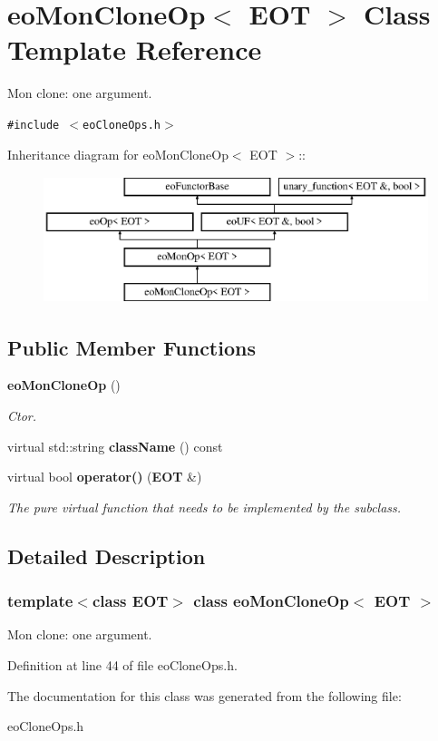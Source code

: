\section{eo\-Mon\-Clone\-Op$<$ EOT $>$ Class Template Reference}
\label{classeo_mon_clone_op}
Mon clone: one argument.  


{\tt \#include $<$eo\-Clone\-Ops.h$>$}

Inheritance diagram for eo\-Mon\-Clone\-Op$<$ EOT $>$::\begin{figure}[H]
\begin{center}
\leavevmode
\includegraphics[height=3.71476cm]{classeo_mon_clone_op}
\end{center}
\end{figure}
\subsection*{Public Member Functions}
\begin{CompactItemize}
\item 
{\bf eo\-Mon\-Clone\-Op} ()\label{classeo_mon_clone_op_a0}

\begin{CompactList}\small\item\em Ctor. \item\end{CompactList}\item 
virtual std::string {\bf class\-Name} () const \label{classeo_mon_clone_op_a1}

\item 
virtual bool {\bf operator()} ({\bf EOT} \&)\label{classeo_mon_clone_op_a2}

\begin{CompactList}\small\item\em The pure virtual function that needs to be implemented by the subclass. \item\end{CompactList}\end{CompactItemize}


\subsection{Detailed Description}
\subsubsection*{template$<$class EOT$>$ class eo\-Mon\-Clone\-Op$<$ EOT $>$}

Mon clone: one argument. 



Definition at line 44 of file eo\-Clone\-Ops.h.

The documentation for this class was generated from the following file:\begin{CompactItemize}
\item 
eo\-Clone\-Ops.h\end{CompactItemize}
